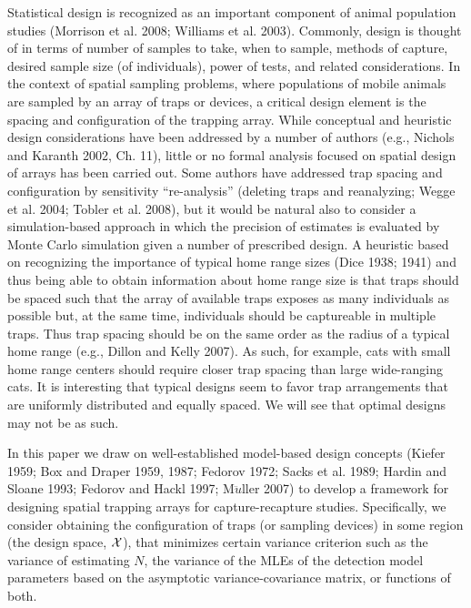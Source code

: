 \documentclass[useAMS,referee]{biom}
\begin{document}
Statistical design is recognized as an important component of animal
population studies (Morrison et al. 2008; Williams et al. 2003).
Commonly, design is thought of in terms of number of samples to take,
when to sample, methods of capture, desired sample size (of
individuals), power of tests, and related considerations.  In the
context of spatial sampling problems, where populations of mobile
animals are sampled by an array of traps or devices, a critical design
element is the spacing and configuration of the trapping array.  While
conceptual and heuristic design considerations have been addressed by
a number of authors (e.g., Nichols and Karanth 2002, Ch. 11), little
or no formal analysis focused on spatial design of arrays has been
carried out.  Some authors have addressed trap spacing and
configuration by sensitivity ``re-analysis'' (deleting traps and
reanalyzing; Wegge et al. 2004; Tobler et al. 2008), but it would be
natural also to consider a simulation-based approach in which the
precision of estimates is evaluated by Monte Carlo simulation given a
number of prescribed design.  A heuristic based on recognizing the
importance of typical home range sizes (Dice 1938; 1941) and thus
being able to obtain information about home range size is that traps
should be spaced such that the array of available traps exposes as
many individuals as possible but, at the same time, individuals should
be captureable in multiple traps.  Thus trap spacing should be on the
same order as the radius of a typical home range (e.g., Dillon and
Kelly 2007).  As such, for example, cats with small home range centers
should require closer trap spacing than large wide-ranging cats. It is
interesting that typical designs seem to favor trap arrangements that
are uniformly distributed and equally spaced. We will see that
optimal designs may not be as such.

In this paper we draw on well-established model-based design concepts
(Kiefer 1959; Box and Draper 1959, 1987; Fedorov 1972;
 Sacks et al. 1989; Hardin
and Sloane 1993; Fedorov and Hackl 1997; M$\ddot{u}$ller 
2007) to develop a framework for
designing spatial trapping arrays for capture-recapture
studies. Specifically, we consider obtaining the configuration of traps
(or sampling devices) in some region (the design space, ${\cal X}$), 
that minimizes certain variance criterion such as the variance of
estimating $N$, the variance of the MLEs of the
detection model parameters based on the asymptotic variance-covariance
matrix, or functions of both. 
\end{document}
